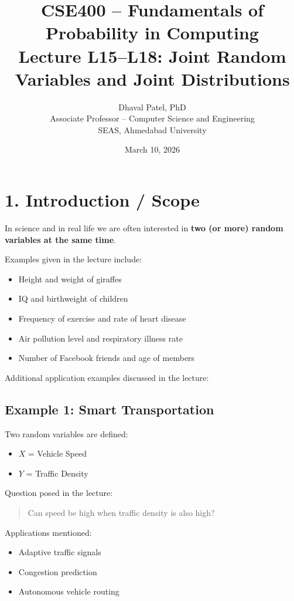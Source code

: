 \documentclass[12pt]{article}
\title{CSE400 -- Fundamentals of Probability in Computing\\
Lecture L15--L18: Joint Random Variables and Joint Distributions}
\author{Dhaval Patel, PhD\\
Associate Professor -- Computer Science and Engineering\\
SEAS, Ahmedabad University}
\date{March 10, 2026}
\begin{document}
\maketitle

\section*{1. Introduction / Scope}

In science and in real life we are often interested in \textbf{two (or more) random variables at the same time}.

Examples given in the lecture include:

\begin{itemize}
\item Height and weight of giraffes
\item IQ and birthweight of children
\item Frequency of exercise and rate of heart disease
\item Air pollution level and respiratory illness rate
\item Number of Facebook friends and age of members
\end{itemize}

Additional application examples discussed in the lecture:

\subsection*{Example 1: Smart Transportation}

Two random variables are defined:

\begin{itemize}
\item $X$ = Vehicle Speed
\item $Y$ = Traffic Density
\end{itemize}

Question posed in the lecture:

\begin{quote}
Can speed be high when traffic density is also high?
\end{quote}

Applications mentioned:

\begin{itemize}
\item Adaptive traffic signals
\item Congestion prediction
\item Autonomous vehicle routing
\end{itemize}
\end{document}
